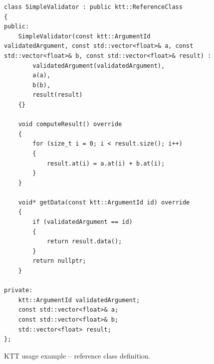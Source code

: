 \documentclass
[
    digital, %
    oneside, %
    table, %
    nolof, %
    nolot, %
    nocover %
]{fithesis3}
\begin{document}
\begin{figure}
\footnotesize
\begin{adjustwidth}{-1cm}{-1cm}
\begin{lstlisting}
class SimpleValidator : public ktt::ReferenceClass
{
public:
    SimpleValidator(const ktt::ArgumentId validatedArgument, const std::vector<float>& a, const std::vector<float>& b, const std::vector<float>& result) :
        validatedArgument(validatedArgument),
        a(a),
        b(b),
        result(result)
    {}
    
    void computeResult() override
    {
        for (size_t i = 0; i < result.size(); i++)
        {
            result.at(i) = a.at(i) + b.at(i);
        }
    }
    
    void* getData(const ktt::ArgumentId id) override
    {
        if (validatedArgument == id)
        {
            return result.data();
        }
        return nullptr;
    }
    
private:
    ktt::ArgumentId validatedArgument;
    const std::vector<float>& a;
    const std::vector<float>& b;
    std::vector<float> result;
};
\end{lstlisting}
\caption{KTT usage example -- reference class definition.}
\label{ktt-api-usage-reference}
\end{adjustwidth}
\end{figure}
\end{document}

